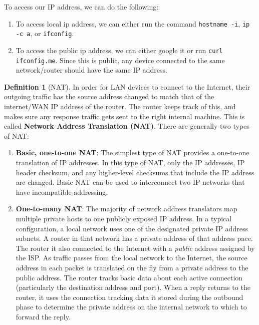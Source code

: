 \documentclass{article}
\theoremstyle{definition}
\newtheorem{definition}{Definition}[section]
\begin{document}
      To access our IP address, we can do the following: 
      \begin{enumerate} 
        \item To access local ip address, we can either run the command \texttt{hostname -i}, \texttt{ip -c a}, or \texttt{ifconfig}.
          
        \item To access the public ip address, we can either google it or run \texttt{curl ifconfig.me}. Since this is public, any device connected to the same network/router should have the same IP address. 
      \end{enumerate}

      \begin{definition}[NAT]
        In order for LAN devices to connect to the Internet, their outgoing traffic has the source address changed to match that of the internet/WAN IP address of the router. The router keeps track of this, and makes sure any response traffic gets sent to the right internal machine. This is called \textbf{Network Address Translation (NAT)}. There are generally two types of NAT: 

        \begin{enumerate}
          \item \textbf{Basic, one-to-one NAT}: The simplest type of NAT provides a one-to-one translation of IP addresses. In this type of NAT, only the IP addresses, IP header checksum, and any higher-level checksums that include the IP address are changed. Basic NAT can be used to interconnect two IP networks that have incompatible addressing. 

          \item \textbf{One-to-many NAT}: The majority of network address translators map multiple private hosts to one publicly exposed IP address. In a typical configuration, a local network uses one of the designated private IP address subnets. A router in that network has a private address of that address pace. The router it also connected to the Internet with a \textit{public} address assigned by the ISP. As traffic passes from the local network to the Internet, the source address in each packet is translated on the fly from a private address to the public address. The router tracks basic data about each active connection (particularly the destination address and port). When a reply returns to the router, it uses the connection tracking data it stored during the outbound phase to determine the private address on the internal network to which to forward the reply. 
        \end{enumerate}
      \end{definition}
\end{document}
